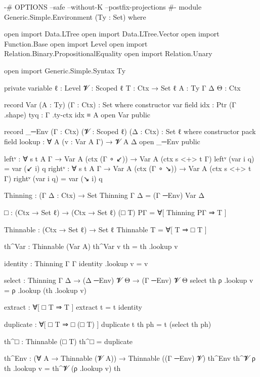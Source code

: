\begin{code}
{-# OPTIONS --safe --without-K --postfix-projections #-}
module Generic.Simple.Environment (Ty : Set) where

  open import Data.LTree
  open import Data.LTree.Vector
  open import Function.Base
  open import Level
  open import Relation.Binary.PropositionalEquality
  open import Relation.Unary

  open import Generic.Simple.Syntax Ty

  private
    variable
      ℓ : Level
      𝓥 : Scoped ℓ
      T : Ctx → Set ℓ
      A : Ty
      Γ Δ Θ : Ctx

  record Var (A : Ty) (Γ : Ctx) : Set where
    constructor var
    field
      idx : Ptr (Γ .shape)
      tyq : Γ .ty-ctx idx ≡ A
  open Var public

  record _─Env (Γ : Ctx) (𝓥 : Scoped ℓ) (Δ : Ctx) : Set ℓ where
    constructor pack
    field lookup : ∀ {A} (v : Var A Γ) → 𝓥 A Δ
  open _─Env public

  leftᵛ : ∀ {s t A Γ} → Var A (ctx (Γ ∘ ↙)) → Var A (ctx {s <+> t} Γ)
  leftᵛ (var i q) = var (↙ i) q
  rightᵛ : ∀ {s t A Γ} → Var A (ctx (Γ ∘ ↘)) → Var A (ctx {s <+> t} Γ)
  rightᵛ (var i q) = var (↘ i) q

  Thinning : (Γ Δ : Ctx) → Set
  Thinning Γ Δ = (Γ ─Env) Var Δ

  □ : (Ctx → Set ℓ) → (Ctx → Set ℓ)
  (□ T) PΓ = ∀[ Thinning PΓ ⇒ T ]

  Thinnable : (Ctx → Set ℓ) → Set ℓ
  Thinnable T = ∀[ T ⇒ □ T ]

  th^Var : Thinnable (Var A)
  th^Var v th = th .lookup v

  identity : Thinning Γ Γ
  identity .lookup v = v

  select : Thinning Γ Δ → (Δ ─Env) 𝓥 Θ → (Γ ─Env) 𝓥 Θ
  select th ρ .lookup v = ρ .lookup (th .lookup v)

  extract : ∀[ □ T ⇒ T ]
  extract t = t identity

  duplicate : ∀[ □ T ⇒ □ (□ T) ]
  duplicate t th ph = t (select th ph)

  th^□ : Thinnable (□ T)
  th^□ = duplicate

  th^Env : (∀ {A} → Thinnable (𝓥 A)) → Thinnable ((Γ ─Env) 𝓥)
  th^Env th^𝓥 ρ th .lookup v = th^𝓥 (ρ .lookup v) th
\end{code}
